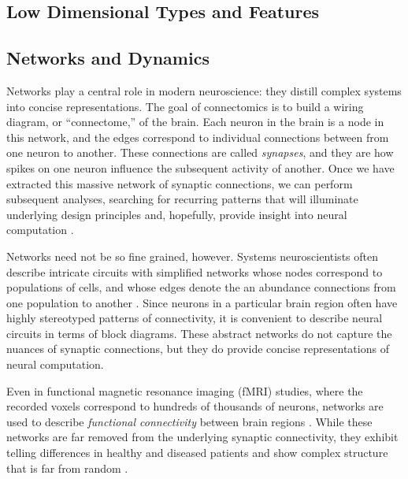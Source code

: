 \subsection{Low Dimensional Types and Features}

\subsection{Networks and Dynamics}
Networks play a central role in modern neuroscience: they distill
complex systems into concise representations.  The goal of
connectomics \cite{sporns2005human} is to build a wiring diagram, or
``connectome,'' of the brain. Each neuron in the brain is a node in
this network, and the edges correspond to individual connections
between from one neuron to another. These connections are called
\emph{synapses}, and they are how spikes on one neuron influence the
subsequent activity of another.  Once we have extracted this massive
network of synaptic connections, we can perform subsequent analyses,
searching for recurring patterns that will illuminate underlying
design principles and, hopefully, provide insight into neural
computation \cite{bullmore2009complex}.


Networks need not be so fine grained, however.  Systems neuroscientists
often describe intricate circuits with simplified networks whose nodes
correspond to populations of cells, and whose edges denote the an
abundance connections from one population to another
\cite[e.g.]{felleman1991distributed, scannell1999connectional}.  Since
neurons in a particular brain region often have highly stereotyped
patterns of connectivity, it is convenient to describe neural circuits
in terms of block diagrams.  These abstract networks do not capture
the nuances of synaptic connections, but they do provide concise
representations of neural computation.

Even in functional magnetic resonance imaging (fMRI) studies, where the
recorded voxels correspond to hundreds of thousands of neurons, networks
are used to describe \emph{functional connectivity} between brain regions
\cite{friston1994functional}. While these networks are far removed from
the underlying synaptic connectivity, they exhibit telling differences
in healthy and diseased patients \cite{bassett2008hierarchical}
and show complex structure that is far from random \cite{bassett2006small}.

